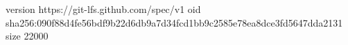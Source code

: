 version https://git-lfs.github.com/spec/v1
oid sha256:090f88d4fe56bdf9b22d6db9a7d34fcd1bb9c2585e78ea8dce3fd5647dda2131
size 22000

